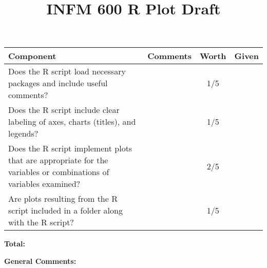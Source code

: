 \documentclass[12pt]{article}
\title{INFM 600 R Plot Draft}
\date{\vspace{-10ex}}%
\newcommand\tab[1][0.25cm]{\hspace*{#1}}
\begin{document}
	\maketitle
		\renewcommand{\arraystretch}{2}
		\begin{tabulary}{6.5in}{| p{2.75in} | p{2.5in} | c | c |}
			\hline
			\textbf{Component} & \textbf{Comments} & \textbf{Worth} & \textbf{Given}\\
			\hline
			Does the R script load necessary packages and include useful comments?  & &  1/5 & \\
			\hline
			Does the R script include clear labeling of axes, charts (titles), and legends? & & 1/5 &\\
			\hline
			Does the R script implement plots that are appropriate for the variables or combinations of variables examined? & &  2/5 & \\
			\hline
			Are plots resulting from the R script included in a folder along with the R script? & &  1/5 & \\
			\hline
		\end{tabulary}

\begin{flushright}
	\textbf{Total:}\tab[3.3cm]
\end{flushright}


	\textbf{General Comments:}

	
\end{document}
